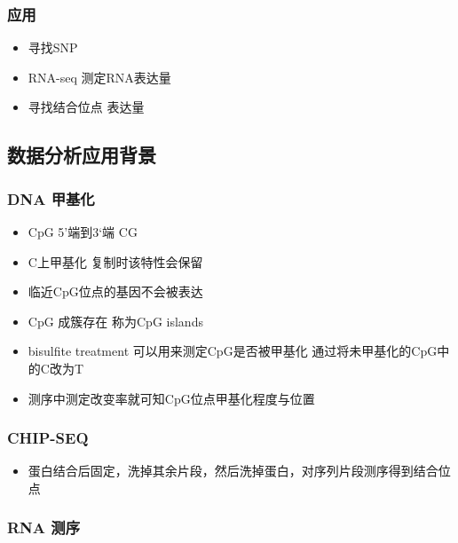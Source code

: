 \documentclass[
]{book}
\providecommand{\tightlist}{%
  \setlength{\itemsep}{0pt}\setlength{\parskip}{0pt}}
\begin{document}
\hypertarget{ux5e94ux7528-1}{%
\subsubsection{应用}\label{ux5e94ux7528-1}}

\begin{itemize}
\tightlist
\item
  寻找SNP
\item
  RNA-seq 测定RNA表达量
\item
  寻找结合位点 表达量
\end{itemize}

\hypertarget{ux6570ux636eux5206ux6790ux5e94ux7528ux80ccux666f}{%
\subsection{数据分析应用背景}\label{ux6570ux636eux5206ux6790ux5e94ux7528ux80ccux666f}}

\hypertarget{dna-ux7532ux57faux5316}{%
\subsubsection{DNA 甲基化}\label{dna-ux7532ux57faux5316}}

\begin{itemize}
\tightlist
\item
  CpG 5'端到3`端 CG
\item
  C上甲基化 复制时该特性会保留
\item
  临近CpG位点的基因不会被表达
\item
  CpG 成簇存在 称为CpG islands
\item
  bisulfite treatment 可以用来测定CpG是否被甲基化 通过将未甲基化的CpG中的C改为T
\item
  测序中测定改变率就可知CpG位点甲基化程度与位置
\end{itemize}

\hypertarget{chip-seq}{%
\subsubsection{CHIP-SEQ}\label{chip-seq}}

\begin{itemize}
\tightlist
\item
  蛋白结合后固定，洗掉其余片段，然后洗掉蛋白，对序列片段测序得到结合位点
\end{itemize}

\hypertarget{rna-ux6d4bux5e8f}{%
\subsubsection{RNA 测序}\label{rna-ux6d4bux5e8f}}
\end{document}
